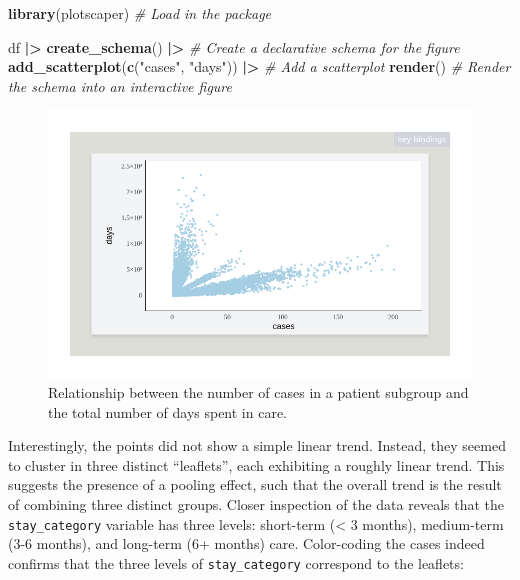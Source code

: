 \documentclass[
]{book}
\newenvironment{Shaded}{\begin{snugshade}}{\end{snugshade}}
\newcommand{\CommentTok}[1]{\textcolor[rgb]{0.56,0.35,0.01}{\textit{#1}}}
\newcommand{\FunctionTok}[1]{\textcolor[rgb]{0.13,0.29,0.53}{\textbf{#1}}}
\newcommand{\NormalTok}[1]{#1}
\newcommand{\SpecialCharTok}[1]{\textcolor[rgb]{0.81,0.36,0.00}{\textbf{#1}}}
\newcommand{\StringTok}[1]{\textcolor[rgb]{0.31,0.60,0.02}{#1}}
\theoremstyle{definition}
\theoremstyle{definition}
\theoremstyle{definition}
\theoremstyle{definition}
\theoremstyle{remark}
\begin{document}
\begin{Shaded}
\begin{Highlighting}[]
\FunctionTok{library}\NormalTok{(plotscaper) }\CommentTok{\# Load in the package}

\NormalTok{df }\SpecialCharTok{|\textgreater{}}
  \FunctionTok{create\_schema}\NormalTok{() }\SpecialCharTok{|\textgreater{}} \CommentTok{\# Create a declarative schema for the figure}
  \FunctionTok{add\_scatterplot}\NormalTok{(}\FunctionTok{c}\NormalTok{(}\StringTok{"cases"}\NormalTok{, }\StringTok{"days"}\NormalTok{)) }\SpecialCharTok{|\textgreater{}} \CommentTok{\# Add a scatterplot}
  \FunctionTok{render}\NormalTok{() }\CommentTok{\# Render the schema into an interactive figure}
\end{Highlighting}
\end{Shaded}

\begin{figure}

{\centering \includegraphics[width=1\linewidth,height=1\textheight]{./figures/example-cases-days} 

}

\caption{Relationship between the number of cases in a patient subgroup and the total number of days spent in care.}\label{fig:example-cases-days}
\end{figure}

Interestingly, the points did not show a simple linear trend. Instead, they seemed to cluster in three distinct ``leaflets'', each exhibiting a roughly linear trend. This suggests the presence of a pooling effect, such that the overall trend is the result of combining three distinct groups. Closer inspection of the data reveals that the \texttt{stay\_category} variable has three levels: short-term (\textless{} 3 months), medium-term (3-6 months), and long-term (6+ months) care. Color-coding the cases indeed confirms that the three levels of \texttt{stay\_category} correspond to the leaflets:
\end{document}
